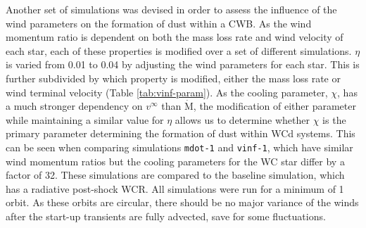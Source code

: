 Another set of simulations was devised in order to assess the influence of the wind parameters on the formation of dust within a CWB.
As the wind momentum ratio is dependent on both the mass loss rate and wind velocity of each star, each of these properties is modified over a set of different simulations.
$\eta$ is varied from 0.01 to 0.04 by adjusting the wind parameters for each star.
This is further subdivided by which property is modified, either the mass loss rate or wind terminal velocity (Table \ref{tab:vinf-param}).
As the cooling parameter, $\chi$, has a much stronger dependency on $v^\infty$ than $\dot{\text{M}}$, the modification of either parameter while maintaining a similar value for $\eta$ allows us to determine whether $\chi$ is the primary parameter determining the formation of dust within WCd systems.
This can be seen when comparing simulations \texttt{mdot-1} and \texttt{vinf-1}, which have similar wind momentum ratios but the cooling parameters for the WC star differ by a factor of 32.
These simulations are compared to the baseline simulation, which has a radiative post-shock WCR.
All simulations were run for a minimum of 1 orbit.
As these orbits are circular, there should be no major variance of the winds after the start-up transients are fully advected, save for some fluctuations.

